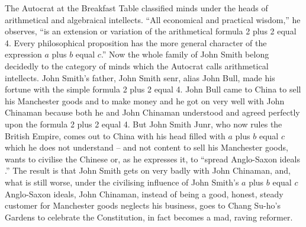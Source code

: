 The Autocrat at the Breakfast Table classified minds under the heads of arithmetical and algebraical intellects.
``All economical and practical wisdom,'' he observes, ``is an extension or variation of the arithmetical formula 2 plus 2 equal 4.
Every philosophical proposition has the more general character of the expression $a$ plus $b$ equal $c$.''
Now the whole family of John Smith belong decidedly to the category of minds
which the Autocrat calls arithmetical intellects.
John Smith's father, John Smith senr, alias John Bull,
made his fortune with the simple formula 2 plus 2 equal 4.
John Bull came to China to sell his Manchester goods and to make money
and he got on very well with John Chinaman
because both he and John Chinaman understood and agreed perfectly upon
the formula 2 plus 2 equal 4.
But John Smith Junr, who now rules the British Empire,
comes out to China with his head filled with $a$ plus $b$ equal $c$
which he does not understand
-- and not content to sell his Manchester goods, wants to civilise the Chinese or, as he expresses it, to ``spread Anglo-Saxon ideals .''
The result is that John Smith gets on very badly with John Chinaman, and, what is still worse, under the civilising influence of John Smith's $a$ plus $b$ equal $c$ Anglo-Saxon ideals,
John Chinaman, instead of being a good, honest, steady customer for Manchester goods neglects his business,
goes to Chang Su-ho's Gardens to celebrate the Constitution,
in fact becomes a mad, raving reformer.

